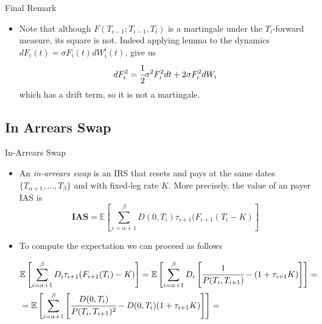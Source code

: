 \documentclass{beamer}
\begin{document}
\begin{frame}{Final Remark}
\begin{itemize}
\item Note that although $F(T_{i-1};T_{i-1},T_i)$ is a martingale under the $T_i$-forward measure, its square is not. Indeed applying \ito lemma to the dynamics $dF_i(t) = \sigma F_i(t)dW^i_i(t)$, give us
\begin{equation}
dF_i^2=\cfrac{1}{2}\sigma^2F_i^2dt+2\sigma F_i^2dW_i
\end{equation}
which has a drift term, so it is not a martingale.
\end{itemize}
\end{frame}

\subsection{In Arrears Swap}
\begin{frame}{In-Arrears Swap}
\begin{itemize}
\item An \emph{in-arrears swap} is an IRS that resets and pays at the same dates $\{T_{\alpha+1},\ldots, T_\beta\}$ and with fixed-leg rate $K$. More precisely, the value of an payer IAS is
\begin{equation}
\textbf{IAS}=\mathbb{E}\left[\sum_{i=\alpha+1}^{\beta}D(0,T_i)\tau_{i+1}(F_{i+1}(T_i-K)\right]
\end{equation}
\item To compute the expectation we can proceed as follows

\begin{equation*}
\begin{aligned}
&\mathbb{E}\left[\sum_{i=\alpha+1}^{\beta}D_i\tau_{i+1}(F_{i+1}(T_i)-K)\right] =\mathbb{E}\left[\sum_{i=\alpha+1}^{\beta}D_i\left[\cfrac{1}{P(T_i,T_{i+1})}-(1+\tau_{i+1}K)\right]\right] = \\
&=\mathbb{E}\left[\sum_{i=\alpha+1}^{\beta}\left[\cfrac{D(0,T_i)}{P(T_i,T_{i+1})^2}-D(0,T_i)(1+\tau_{i+1}K)\right]\right] = \\
\end{aligned}
\end{equation*}
\end{itemize}
\end{frame}
\end{document}
